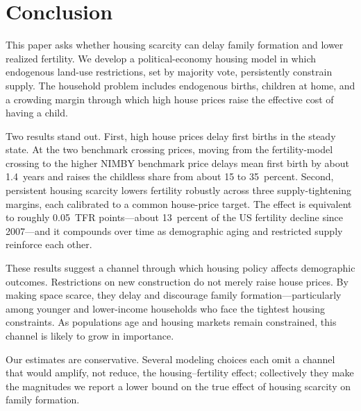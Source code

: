 \documentclass[11pt]{article}
\begin{document}





\section{Conclusion}

This paper asks whether housing scarcity can delay family formation and lower realized
fertility. We develop a political-economy housing model in which endogenous land-use
restrictions, set by majority vote, persistently constrain supply. The household problem
includes endogenous births, children at home, and a crowding margin through which high house
prices raise the effective cost of having a child.

Two results stand out. First, high house prices delay first births in the steady state. At
the two benchmark crossing prices, moving from the fertility-model crossing to the higher
NIMBY benchmark price delays mean first birth by about 1.4~years and raises the childless
share from about 15 to 35~percent. Second, persistent housing
scarcity lowers fertility robustly across three supply-tightening margins, each calibrated to
a common house-price target. The effect is equivalent to roughly 0.05~TFR points---about
13~percent of the US fertility decline since 2007---and it compounds over time as demographic
aging and restricted supply reinforce each other.

These results suggest a channel through which housing policy affects demographic outcomes.
Restrictions on new construction do not merely raise house prices. By making space scarce,
they delay and discourage family formation---particularly among younger and lower-income
households who face the tightest housing constraints. As populations age and housing markets
remain constrained, this channel is likely to grow in importance.

Our estimates are conservative. Several modeling choices each omit a channel that would
amplify, not reduce, the housing--fertility effect; collectively they make the magnitudes we
report a lower bound on the true effect of housing scarcity on family formation.
\end{document}
